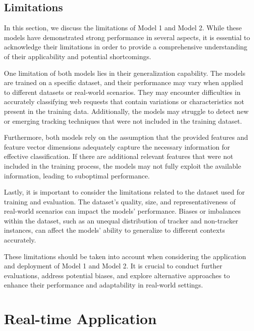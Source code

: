 \subsection{Limitations}
In this section, we discuss the limitations of Model 1 and Model 2. While these models have demonstrated strong performance in several aspects, it is essential
to acknowledge their limitations in order to provide a comprehensive understanding of their applicability and potential shortcomings.

One limitation of both models lies in their generalization capability. The models are trained on a specific dataset,
and their performance may vary when applied to different datasets or real-world scenarios. They may encounter difficulties
in accurately classifying web requests that contain variations or characteristics not present in the training data. Additionally,
the models may struggle to detect new or emerging tracking techniques that were not included in the training dataset.

Furthermore, both models rely on the assumption that the provided features and feature vector dimensions adequately capture the
necessary information for effective classification. If there are additional relevant features that were not included in the training
process, the models may not fully exploit the available information, leading to suboptimal performance.

Lastly, it is important to consider the limitations related to the dataset used for training and evaluation. The dataset's quality,
size, and representativeness of real-world scenarios can impact the models' performance. Biases or imbalances within the dataset,
such as an unequal distribution of tracker and non-tracker instances, can affect the models' ability to generalize to different
contexts accurately.

These limitations should be taken into account when considering the application and deployment of Model 1 and Model 2. It is
crucial to conduct further evaluations, address potential biases, and explore alternative approaches to enhance their performance
and adaptability in real-world settings.

\section{Real-time Application}

